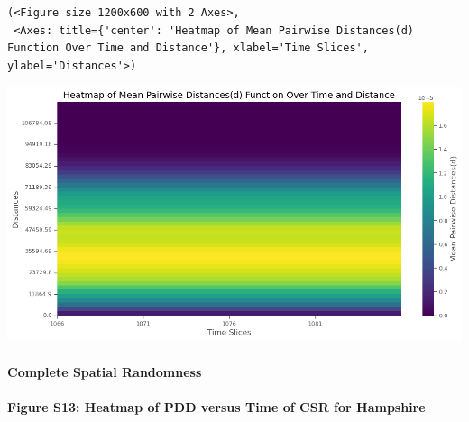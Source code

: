 \documentclass[
  11pt,
  letterpaper,
  DIV=11,
  numbers=noendperiod]{scrartcl}
\let\oldparagraph\paragraph
\renewcommand{\paragraph}[1]{\oldparagraph{#1}\mbox{}}
\begin{document}
\begin{verbatim}
(<Figure size 1200x600 with 2 Axes>,
 <Axes: title={'center': 'Heatmap of Mean Pairwise Distances(d) Function Over Time and Distance'}, xlabel='Time Slices', ylabel='Distances'>)
\end{verbatim}

\includegraphics{analysis_files/figure-pdf/cell-27-output-2.png}

\paragraph{Complete Spatial
Randomness}\label{complete-spatial-randomness-1}

\paragraph{Figure S13: Heatmap of PDD versus Time of CSR for
Hampshire}\label{figure-s13-heatmap-of-pdd-versus-time-of-csr-for-hampshire}
\end{document}
